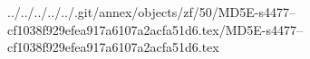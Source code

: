 ../../../../../.git/annex/objects/zf/50/MD5E-s4477--cf1038f929efea917a6107a2acfa51d6.tex/MD5E-s4477--cf1038f929efea917a6107a2acfa51d6.tex